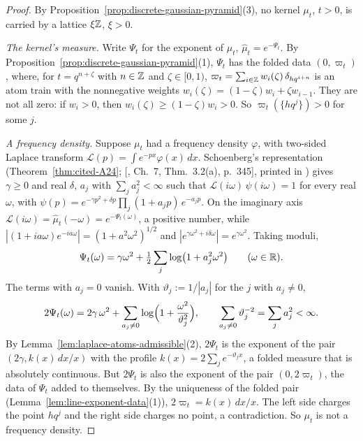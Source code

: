 \begin{proof}
By Proposition~\ref{prop:discrete-gaussian-pyramid}(3), no kernel $\mu_t$, $t > 0$, is carried by a
lattice $\xi\mathbb{Z}$, $\xi > 0$.

\emph{The kernel's \Levy{} measure.} Write $\Psi_t$ for the exponent of $\mu_t$,
$\widehat\mu_t = e^{-\Psi_t}$. By Proposition~\ref{prop:discrete-gaussian-pyramid}(1), $\Psi_t$ has
the folded data $(0, \varpi_t)$, where, for $t = q^{n+\zeta}$ with $n \in \mathbb{Z}$ and $\zeta \in [0, 1)$,
$\varpi_t = \sum_{i \in \mathbb{Z}}w_i(\zeta)\,\delta_{hq^{i+n}}$ is an atom train with the nonnegative
weights $w_i(\zeta) = (1 - \zeta)w_i + \zeta w_{i-1}$. They are not all zero: if $w_i > 0$, then
$w_i(\zeta) \ge (1 - \zeta)w_i > 0$. So $\varpi_t(\{hq^j\}) > 0$ for some $j$.

\emph{A \Polya{} frequency density.} Suppose $\mu_t$ had a \Polya{} frequency density $\varphi$,
with two-sided Laplace transform $\mathcal{L}(p) = \int e^{-px}\varphi(x)\,dx$. Schoenberg's
representation (Theorem~\ref{thm:cited-A24}; [, Ch.~7, Thm.~3.2(a),
p.~345], printed in ) gives $\gamma \ge 0$ and real
$\delta$, $a_j$ with $\sum_ja_j^2 < \infty$ such that
$\mathcal{L}(i\omega)\,\psi(i\omega) = 1$ for every real $\omega$, with
$\psi(p) = e^{-\gamma p^2 + \delta p}\prod_j(1 + a_jp)\,e^{-a_jp}$. On the imaginary axis
$\mathcal{L}(i\omega) = \widehat\mu_t(-\omega) = e^{-\Psi_t(\omega)}$, a positive number, while
$|(1 + ia\omega)e^{-ia\omega}| = (1 + a^2\omega^2)^{1/2}$ and $|e^{\gamma\omega^2 + i\delta\omega}| =
e^{\gamma\omega^2}$. Taking moduli,
\[
  \Psi_t(\omega) = \gamma\omega^2 + \tfrac12\sum_j\log\bigl(1 + a_j^2\omega^2\bigr)
  \qquad (\omega \in \mathbb{R}).
\]
The terms with $a_j = 0$ vanish. With $\vartheta_j := 1/|a_j|$ for the $j$ with $a_j \ne 0$,
\[
  2\Psi_t(\omega) = 2\gamma\,\omega^2 + \sum_{a_j \ne 0}\log\Bigl(1 + \frac{\omega^2}{\vartheta_j^2}\Bigr),
  \qquad \sum_{a_j \ne 0}\vartheta_j^{-2} = \sum_ja_j^2 < \infty .
\]
By Lemma~\ref{lem:laplace-atoms-admissible}(2), $2\Psi_t$ is the exponent of the pair
$(2\gamma, k(x)\,dx/x)$ with the profile $k(x) = 2\sum_je^{-\vartheta_jx}$, a folded \Levy{} measure
that is absolutely continuous. But $2\Psi_t$ is also the exponent of the pair $(0, 2\varpi_t)$, the
data of $\Psi_t$ added to themselves. By the uniqueness of the folded pair
(Lemma~\ref{lem:line-exponent-data}(1)), $2\varpi_t = k(x)\,dx/x$. The left side charges the point
$hq^j$ and the right side charges no point, a contradiction. So $\mu_t$ is not a \Polya{}
frequency density.
\end{proof}

